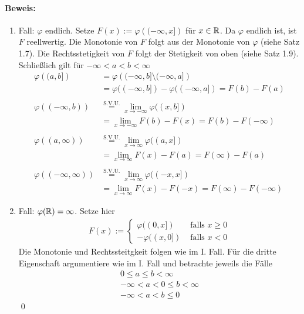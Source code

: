 \documentclass[12pt]{report}
\begin{document}
\paragraph{Beweis:} 
\begin{enumerate}[label=\Roman*.]
    \item Fall: $\varphi$ endlich.\newline
    Setze $F(x):=\varphi\left((-\infty,x]\right)$ f\"ur $x\in\mathbb{R}$. Da $\varphi$ endlich ist, ist $F$ reellwertig. Die Monotonie von $F$ folgt aus der Monotonie von $\varphi$ (siehe Satz 1.7). Die Rechtsstetigkeit von $F$ folgt der Stetigkeit von oben (siehe Satz 1.9). Schlie\ss{}lich gilt f\"ur $-\infty<a<b<\infty$
    \begin{align*}
        \varphi\left((a,b]\right)&=\varphi\left((-\infty,b]\setminus(-\infty,a]\right)\\
        &=\varphi((-\infty,b])-\varphi((-\infty,a])=F(b)-F(a)\\ \\
        \varphi((-\infty,b))&\overset{\text{S.V.U.}}{=}\lim_{x\to-\infty}\varphi((x,b])\\
        &=\lim_{x\to-\infty}F(b)-F(x)=F(b)-F(-\infty)\\ \\
        \varphi((a,\infty))&\overset{\text{S.V.U.}}{=}\lim_{x\to\infty}\varphi((a,x])\\
        &=\lim_{x\to\infty}F(x)-F(a)=F(\infty)-F(a) \\ \\
        \varphi((-\infty,\infty))&\overset{\text{S.V.U.}}{=}\lim_{x\to\infty}\varphi((-x,x])\\
        &=\lim_{x\to\infty}F(x)-F(-x)=F(\infty)-F(-\infty)
    \end{align*}
    \item Fall: $\varphi(\mathbb{R})=\infty$.\newline
    Setze hier
    \begin{align*}
        F(x):=
        \begin{cases}
            \varphi((0,x])&\text{ falls }x\geq0 \\
            -\varphi((x,0])&\text{ falls }x<0
        \end{cases}
    \end{align*}
    Die Monotonie und Rechtssteitgkeit folgen wie im I. Fall. F\"ur die dritte Eigenschaft argumentiere wie im I. Fall und betrachte jeweils die F\"alle
    \begin{align*}
        0\leq a\leq b<\infty \\ 
        -\infty<a<0\leq b<\infty \\ 
        -\infty<a<b\leq 0
    \end{align*}
    \qed
\end{enumerate}
\end{document}
